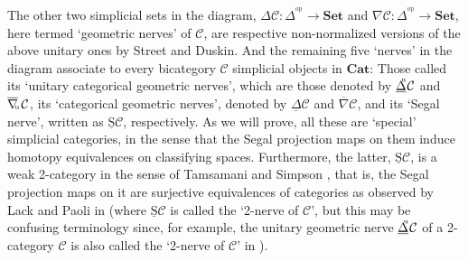 \documentclass[]{amsart}
\begin{document}
The other two simplicial sets in the diagram, ${\ensuremath{\Delta}}{\ensuremath{\mathcal{C}}}:\Delta^{\!{^\mathrm{op}}} \to {\ensuremath{\mathbf{Set}}}$ and
$\nabla{\ensuremath{\mathcal{C}}}:\Delta^{\!{^\mathrm{op}}} \to {\ensuremath{\mathbf{Set}}}$, here termed  `geometric nerves' of ${\ensuremath{\mathcal{C}}}$, are
respective non-normalized versions of the above unitary ones by Street and Duskin. And the
remaining five `nerves' in the diagram associate to every bicategory ${\ensuremath{\mathcal{C}}}$ simplicial objects in
${\ensuremath{\mathbf{Cat}}}$: Those called its `unitary categorical geometric nerves', which are those denoted by
${\ensuremath{\underline{\Delta}}}\hspace{-4pt}^{^\mathrm{u}}{\ensuremath{\mathcal{C}}}$ and $\overline{\nabla}\hspace{-2.5pt}_{^{_\mathrm{u}}}{\ensuremath{\mathcal{C}}}$,
its `categorical geometric nerves', denoted by ${\ensuremath{\underline{\Delta}}}{\ensuremath{\mathcal{C}}}$ and $\overline{\nabla}{\ensuremath{\mathcal{C}}}$, and its `Segal
nerve', written as $\underline{\mathrm{S}}{\ensuremath{\mathcal{C}}}$, respectively. As we will prove, all these are
`special' simplicial categories, in the sense  that \cite{segal74, thomason} the Segal projection
maps on them induce homotopy equivalences on classifying spaces. Furthermore, the latter,
$\underline{\mathrm{S}}{\ensuremath{\mathcal{C}}}$, is a weak 2-category in the sense of Tamsamani \cite{tam} and Simpson
\cite{sim}, that is, the Segal projection maps on it are surjective equivalences of categories as
observed by Lack and Paoli in \cite{lack-paoli} (where $\underline{\mathrm{S}}{\ensuremath{\mathcal{C}}}$ is called the
`2-nerve of ${\ensuremath{\mathcal{C}}}$', but this may be  confusing terminology since, for example, the unitary geometric
nerve  ${\ensuremath{\underline{\Delta}}}\hspace{-4pt}^{^\mathrm{u}}{\ensuremath{\mathcal{C}}}$ of a 2-category ${\ensuremath{\mathcal{C}}}$ is also called the `2-nerve of
${\ensuremath{\mathcal{C}}}$' in  \cite{tonks}).
\end{document}
